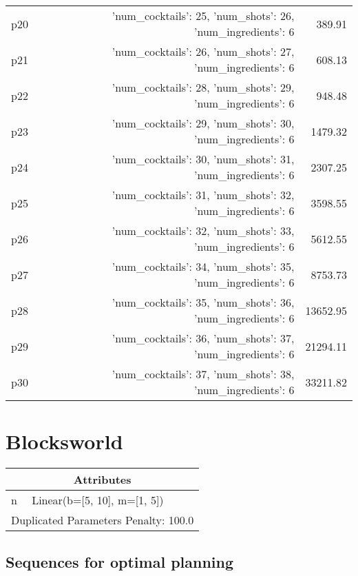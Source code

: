 \documentclass{article}
\begin{document}
\begin{center}
\begin{tabular}{@{}l|r|r@{}}
  p20&{'num\_cocktails': 25, 'num\_shots': 26, 'num\_ingredients': 6}&389.91\\
  p21&{'num\_cocktails': 26, 'num\_shots': 27, 'num\_ingredients': 6}&608.13\\
  p22&{'num\_cocktails': 28, 'num\_shots': 29, 'num\_ingredients': 6}&948.48\\
  p23&{'num\_cocktails': 29, 'num\_shots': 30, 'num\_ingredients': 6}&1479.32\\
  p24&{'num\_cocktails': 30, 'num\_shots': 31, 'num\_ingredients': 6}&2307.25\\
  p25&{'num\_cocktails': 31, 'num\_shots': 32, 'num\_ingredients': 6}&3598.55\\
  p26&{'num\_cocktails': 32, 'num\_shots': 33, 'num\_ingredients': 6}&5612.55\\
  p27&{'num\_cocktails': 34, 'num\_shots': 35, 'num\_ingredients': 6}&8753.73\\
  p28&{'num\_cocktails': 35, 'num\_shots': 36, 'num\_ingredients': 6}&13652.95\\
  p29&{'num\_cocktails': 36, 'num\_shots': 37, 'num\_ingredients': 6}&21294.11\\
  p30&{'num\_cocktails': 37, 'num\_shots': 38, 'num\_ingredients': 6}&33211.82
                            \end{tabular}
                            \end{center}
                    
                            \newpage \section{Blocksworld}
                    \begin{center}
                    \begin{tabular}{@{}p{}p{}@{}}
                    \multicolumn{2}{c}{\bf \large Attributes}\\\midrule
                    n & Linear(b=[5, 10], m=[1, 5]) \\\midrule
                    \multicolumn{2}{l}{Duplicated Parameters Penalty: 100.0}
                    \end{tabular}
                    \end{center}
                
                            \subsection*{Sequences for optimal planning}
\end{document}
